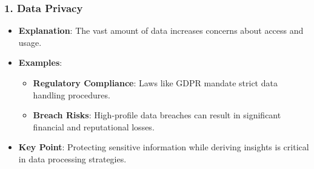 \documentclass[aspectratio=169]{beamer}
\begin{document}
\begin{frame}[fragile]
  \frametitle{1. Data Privacy}
  \begin{itemize}
    \item \textbf{Explanation}: The vast amount of data increases concerns about access and usage.
    \item \textbf{Examples}:
    \begin{itemize}
      \item \textbf{Regulatory Compliance}: Laws like GDPR mandate strict data handling procedures.
      \item \textbf{Breach Risks}: High-profile data breaches can result in significant financial and reputational losses.
    \end{itemize}
    \item \textbf{Key Point}: Protecting sensitive information while deriving insights is critical in data processing strategies.
  \end{itemize}
\end{frame}
\end{document}

